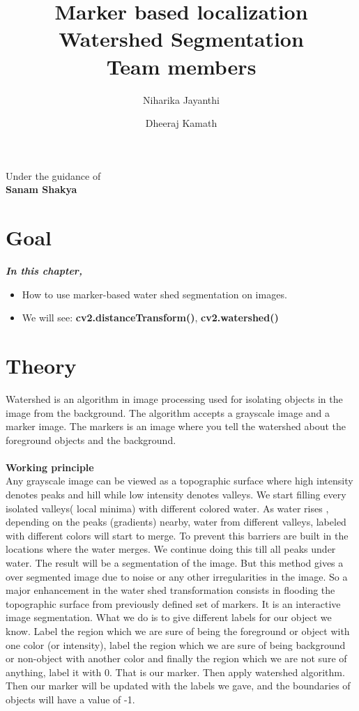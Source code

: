 \documentclass[]{article}
\date{}
\title {Marker based localization \\ [10pt]
	Watershed Segmentation  \\[25pt] Team members }
\author {Niharika Jayanthi \and Dheeraj Kamath}
\begin{document}
\maketitle
\begin{center}
	\begin{large}
		Under the guidance of\\
		\textbf{Sanam Shakya}\\
		\vspace{0.5in}
	\end{large}
\end{center}
\section{Goal}\label{goal}

\emph{\textbf{\large In this chapter,}} 
\begin{itemize} 
	\Large
	\item How to use marker-based water shed segmentation on images.
    \item  We will see: \textbf{cv2.distanceTransform()}, \textbf{cv2.watershed()}
\end{itemize}

\section{Theory}\label{theory}
\Large
Watershed is an algorithm in image processing used for isolating objects in the image from the background. The algorithm accepts a grayscale image and a marker image. The markers is an image where you tell the watershed about the foreground objects and the background. \\
\\
\Large{\textbf{Working principle}} \\
Any grayscale image can be viewed as a topographic surface where high intensity denotes peaks and hill while low intensity denotes valleys. We start filling every isolated valleys( local minima) with different colored water. As water rises , depending on the peaks (gradients) nearby, water from different valleys, labeled with different colors will start to merge. To prevent this barriers are built in the locations where the water merges. We continue doing this till all peaks under water. The result will be a segmentation of the image. But this method gives a over segmented image due to noise or any other irregularities in the image. So a major enhancement in the water shed transformation consists in flooding the topographic surface from previously defined set of markers. It is an interactive image segmentation.
What we do is to give different labels for our object we know. Label the region which we are sure of being the foreground or object with one color (or intensity), label the region which we are sure of being background or non-object with another color and finally the region which we are not sure of anything, label it with 0. That is our marker. Then apply watershed algorithm. Then our marker will be updated with the labels we gave, and the boundaries of objects will have a value of -1.
\end{document}
